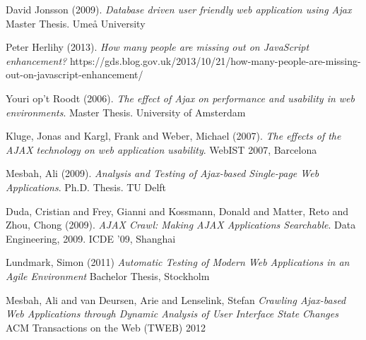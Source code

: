 \documentclass[f,bachelor,binding,twoside,palatino]{WeSTthesis}
\begin{document}
\begin{thebibliography}{9}

    David Jonsson (2009).
    \emph{Database driven user friendly web application using Ajax}
    Master Thesis. Ume\aa{} University

  Peter Herlihy (2013).
  \emph{How many people are missing out on JavaScript enhancement?}
  https://gds.blog.gov.uk/2013/10/21/how-many-people-are-missing-out-on-javascript-enhancement/

  Youri op't Roodt (2006).
  \emph{The effect of Ajax on performance and usability in web environments}.
  Master Thesis. University of Amsterdam

  Kluge, Jonas and Kargl, Frank and Weber, Michael (2007).
  \emph{The effects of the AJAX technology on web application usability}.
  WebIST 2007, Barcelona

  Mesbah, Ali (2009).
  \emph{Analysis and Testing of Ajax-based Single-page Web Applications}.
  Ph.D. Thesis. TU Delft

  Duda, Cristian and Frey, Gianni and Kossmann, Donald and Matter, Reto and Zhou, Chong (2009).
  \emph{AJAX Crawl: Making AJAX Applications Searchable}.
  Data Engineering, 2009. ICDE '09, Shanghai
  
  Lundmark, Simon (2011)
  \emph{Automatic Testing of Modern Web Applications in an Agile Environment}
  Bachelor Thesis, Stockholm

  Mesbah, Ali and van Deursen, Arie and Lenselink, Stefan
  \emph{Crawling {Ajax}-based Web Applications through Dynamic Analysis of User Interface State Changes}
  ACM Transactions on the Web (TWEB) 2012
  
\end{thebibliography}

\printglossary
\end{document}
